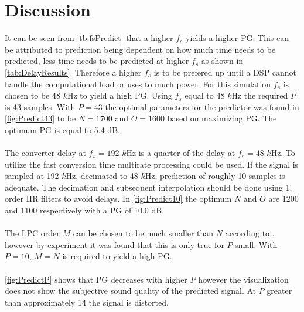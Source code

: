 \section{Discussion}
It can be seen from \autoref{tb:fsPredict} that a higher $f_s$ yields a higher PG. This can be attributed to prediction being dependent on how much time needs to be predicted, less time needs to be predicted at higher $f_s$ as shown in \autoref{tab:DelayResults}.  
Therefore a higher $f_s$ is to be prefered up until a DSP cannot handle the computational load or uses to much power. For this simulation $f_s$ is chosen to be $48$ $k$Hz to yield a high PG. 
Using $f_s$ equal to $48$ $k$Hz the required $P$ is 43 samples. With $P=43$ the optimal parameters for the predictor was found in \autoref{fig:Predict43} to be $N=1700$ and $O=1600$ based on maximizing PG. The optimum PG is equal to 5.4 dB. 
\\\\
The converter delay at $f_s=192$ $k$Hz is a quarter of the delay at $f_s=48$ $k$Hz. To utilize the fast conversion time multirate processing could be used. If the signal is sampled at 192 $k$Hz, decimated to 48 $k$Hz, prediction of roughly 10 samples is adequate. The decimation and subsequent interpolation should be done using 1. order IIR filters to avoid delays. In \autoref{fig:Predict10} the optimum $N$ and $O$ are 1200 and 1100 respectively with a PG of 10.0 dB. 
\\\\
The LPC order $M$ can be chosen to be much smaller than $N$ according to \cite{Speech}, however by experiment it was found that this is only true for $P$ small. With $P=10$, $M=N$ is required to yield a high PG. 
\\\\
\autoref{fig:PredictP} shows that PG decreases with higher $P$ however the visualization does not show the subjective sound quality of the predicted signal. At $P$ greater than approximately 14 the signal is distorted.    
\\\\
